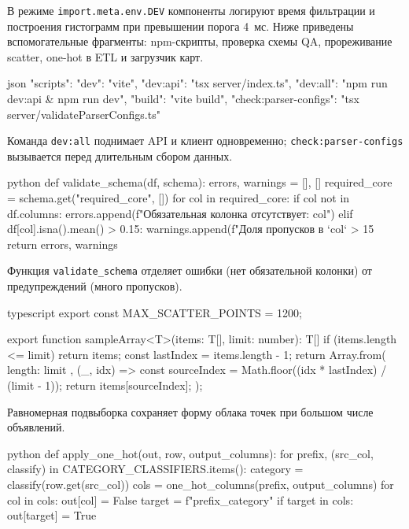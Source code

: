 В режиме \texttt{import.meta.env.DEV} компоненты логируют время фильтрации и построения гистограмм при превышении порога 4~мс. Ниже приведены вспомогательные фрагменты: npm-скрипты, проверка схемы QA, прореживание scatter, one-hot в ETL и загрузчик карт.

\begin{singleminted}{json}
{
  "scripts": {
    "dev": "vite",
    "dev:api": "tsx server/index.ts",
    "dev:all": "npm run dev:api & npm run dev",
    "build": "vite build",
    "check:parser-configs": "tsx server/validateParserConfigs.ts"
  }
}
\end{singleminted}
\label{lst:package-json}

Команда \texttt{dev:all} поднимает API и клиент одновременно; \texttt{check:parser-configs} вызывается перед длительным сбором данных.

\begin{singleminted}{python}
def validate_schema(df, schema):
    errors, warnings = [], []
    required_core = schema.get("required_core", [])
    for col in required_core:
        if col not in df.columns:
            errors.append(f"Обязательная колонка отсутствует: {col}")
        elif df[col].isna().mean() > 0.15:
            warnings.append(f"Доля пропусков в `{col}` > 15%
    return errors, warnings
\end{singleminted}
\label{lst:qa-schema}

Функция \texttt{validate\_schema} отделяет ошибки (нет обязательной колонки) от предупреждений (много пропусков).

\begin{singleminted}{typescript}
export const MAX_SCATTER_POINTS = 1200;

export function sampleArray<T>(items: T[], limit: number): T[] {
    if (items.length <= limit) return items;
    const lastIndex = items.length - 1;
    return Array.from({ length: limit }, (_, idx) => {
        const sourceIndex = Math.floor((idx * lastIndex) / (limit - 1));
        return items[sourceIndex];
    });
}
\end{singleminted}
\label{lst:sample-array}

Равномерная подвыборка сохраняет форму облака точек при большом числе объявлений.

\begin{singleminted}{python}
def apply_one_hot(out, row, output_columns):
    for prefix, (src_col, classify) in CATEGORY_CLASSIFIERS.items():
        category = classify(row.get(src_col))
        cols = one_hot_columns(prefix, output_columns)
        for col in cols:
            out[col] = False
        target = f"{prefix}_{category}"
        if target in cols:
            out[target] = True
\end{singleminted}
\label{lst:one-hot}

